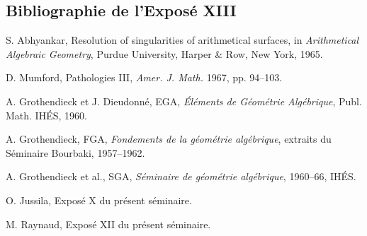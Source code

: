 \documentclass[11pt]{article}
\begin{document}
\subsection*{Bibliographie de l'Expos\'e XIII}
\begin{enumerate}[label={[\arabic*]}]
\item S. Abhyankar, Resolution of singularities of arithmetical surfaces, in \emph{Arithmetical Algebraic Geometry}, Purdue University, Harper \& Row, New York, 1965.
\item D. Mumford, Pathologies III, \emph{Amer. J. Math.} 1967, pp. 94--103.
\item A. Grothendieck et J. Dieudonn\'e, EGA, \emph{\'El\'ements de G\'eom\'etrie Alg\'ebrique}, Publ. Math. IH\'ES, 1960.
\item A. Grothendieck, FGA, \emph{Fondements de la g\'eom\'etrie alg\'ebrique}, extraits du S\'eminaire Bourbaki, 1957--1962.
\item A. Grothendieck et al., SGA, \emph{S\'eminaire de g\'eom\'etrie alg\'ebrique}, 1960--66, IH\'ES.
\item O. Jussila, Expos\'e X du pr\'esent s\'eminaire.
\item M. Raynaud, Expos\'e XII du pr\'esent s\'eminaire.
\end{enumerate}
\end{document}
